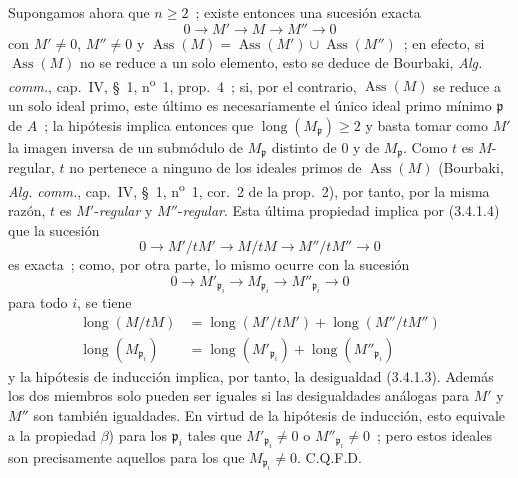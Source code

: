 Supongamos ahora que $n\geqslant2$~; existe entonces una sucesión exacta
\[
0\longrightarrow M'\longrightarrow M\longrightarrow M''\longrightarrow0
\]
con $M'\neq0$, $M''\neq0$ y
$\operatorname{Ass}(M)=\operatorname{Ass}(M')\cup\operatorname{Ass}(M'')$~;
en efecto, si $\operatorname{Ass}(M)$ no se reduce a un solo elemento, esto
se deduce de Bourbaki, \emph{Alg. comm.}, cap.~IV, \S~1,
n\textsuperscript{o}~1, prop.~4~; si, por el contrario, $\operatorname{Ass}(M)$ se reduce a
un solo ideal primo, este último es necesariamente el único ideal primo mínimo
$\mathfrak p$ de $A$~; la hipótesis implica entonces que
$\operatorname{long}(M_{\mathfrak p})\geqslant2$ y basta tomar como $M'$ la
imagen inversa de un submódulo de $M_{\mathfrak p}$ distinto de $0$
y de $M_{\mathfrak p}$. Como $t$ es $M$-regular, $t$ no pertenece a ninguno
de los ideales primos de $\operatorname{Ass}(M)$ (Bourbaki,
\emph{Alg. comm.}, cap.~IV, \S~1, n\textsuperscript{o}~1, cor.~2 de la
prop.~2), por tanto, por la misma razón, $t$ es $M'$-\emph{regular} y
$M''$-\emph{regular}. Esta última propiedad implica por (3.4.1.4) que la sucesión
\[
0\longrightarrow M'/tM'\longrightarrow M/tM
\longrightarrow M''/tM''\longrightarrow0
\]
es exacta~; como, por otra parte, lo mismo ocurre con la sucesión
\[
0\longrightarrow M'_{\mathfrak p_i}\longrightarrow M_{\mathfrak p_i}
\longrightarrow M''_{\mathfrak p_i}\longrightarrow0
\]
para todo $i$, se tiene
\[
\begin{aligned}
\operatorname{long}(M/tM)
&=\operatorname{long}(M'/tM')+\operatorname{long}(M''/tM'')\\
\operatorname{long}(M_{\mathfrak p_i})
&=\operatorname{long}(M'_{\mathfrak p_i})
 +\operatorname{long}(M''_{\mathfrak p_i})
\end{aligned}
\]
y la hipótesis de inducción implica, por tanto, la desigualdad (3.4.1.3). Además
los dos miembros solo pueden ser iguales si las desigualdades análogas para
$M'$ y $M''$ son también igualdades. En virtud de la hipótesis de inducción,
esto equivale a la propiedad $\beta$) para los $\mathfrak p_i$ tales que
$M'_{\mathfrak p_i}\neq0$ o $M''_{\mathfrak p_i}\neq0$~; pero estos ideales son
precisamente aquellos para los que $M_{\mathfrak p_i}\neq0$. C.Q.F.D.

